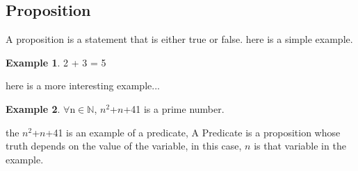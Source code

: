 \documentclass{article}
\theoremstyle{definition}
\newtheorem{example}{Example}
\newcommand{\N}{\mathbb{N}}
\begin{document}
\subsection{Proposition}

A proposition is a statement that is either true or false.
here is a simple example.

\begin{example}
  2 + 3 = 5
\end{example}

here is a more interesting example...

\begin{example}
$\forall$n$\in$$\N$, $n^2$+$n$+41 is a prime number.
\end{example}
the $n^2$+$n$+41 is an example of a predicate, A Predicate is a proposition whose truth depends on the value of the variable, in this case, $n$ is that variable in the example.
\end{document}
